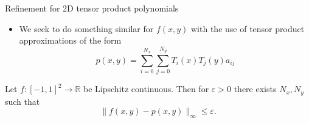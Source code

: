 \documentclass{beamer}
\newcommand{\R}{\mathbb{R}}
\begin{document}
\begin{frame}{Refinement for 2D tensor product polynomials}
\begin{itemize}
\item We seek to do something similar for $f(x,y)$ with the use of tensor product approximations of the form $$ p(x,y) = \sum_{i=0}^{N_x} \sum_{j=0}^{N_y} T_i(x)T_j(y) a_{ij}$$
\end{itemize}

\begin{theorem} 
Let $f:[-1,1]^2 \to \R$ be Lipschitz continuous. Then for $\varepsilon>0$ there exists $N_x,N_y$ such that
$$
\|f(x,y)-p(x,y)\|_{\infty} \leq \varepsilon.
$$
 \end{theorem}

\end{frame}

%


%
%
%
%
\end{document}
